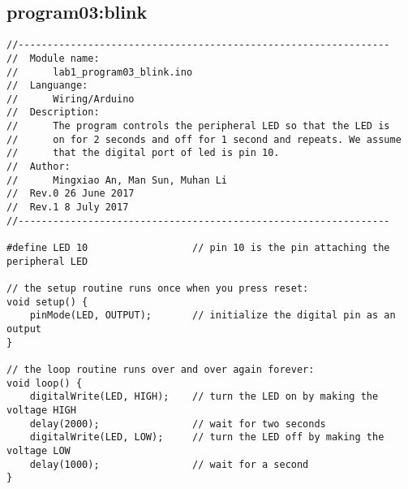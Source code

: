 \subsection{program03:blink}
\begin{verbatim}
//----------------------------------------------------------------
//  Module name:
//      lab1_program03_blink.ino
//  Languange:
//      Wiring/Arduino
//  Description:
//      The program controls the peripheral LED so that the LED is 
//      on for 2 seconds and off for 1 second and repeats. We assume
//      that the digital port of led is pin 10.
//  Author:
//      Mingxiao An, Man Sun, Muhan Li
//  Rev.0 26 June 2017
//  Rev.1 8 July 2017
//----------------------------------------------------------------

#define LED 10                  // pin 10 is the pin attaching the peripheral LED

// the setup routine runs once when you press reset:
void setup() {
    pinMode(LED, OUTPUT);       // initialize the digital pin as an output
}

// the loop routine runs over and over again forever:
void loop() {
    digitalWrite(LED, HIGH);    // turn the LED on by making the voltage HIGH
    delay(2000);                // wait for two seconds
    digitalWrite(LED, LOW);     // turn the LED off by making the voltage LOW
    delay(1000);                // wait for a second
}
\end{verbatim}

